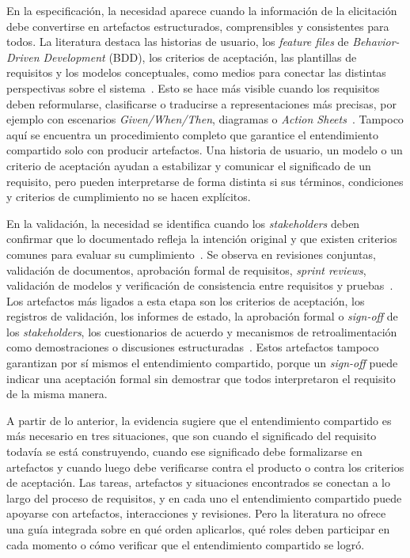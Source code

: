 \documentclass[12pt,letterpaper,oneside]{report}
\begin{document}
En la especificación, la necesidad aparece cuando la información de la
elicitación debe convertirse en artefactos estructurados, comprensibles y
consistentes para todos. La literatura destaca las historias de usuario, los
\textit{feature files} de \textit{Behavior-Driven Development} (BDD), los
criterios de aceptación, las plantillas de requisitos y los modelos
conceptuales, como medios para conectar las distintas perspectivas sobre el
sistema~\cite{irshad2021bdd}. Esto se hace más visible cuando los requisitos
deben reformularse, clasificarse o traducirse a representaciones más precisas,
por ejemplo con escenarios \textit{Given/When/Then}, diagramas o \textit{Action
Sheets}~\cite{gupta2022}. Tampoco aquí se encuentra un procedimiento completo
que garantice el entendimiento compartido solo con producir artefactos. Una
historia de usuario, un modelo o un criterio de aceptación ayudan a estabilizar
y comunicar el significado de un requisito, pero pueden interpretarse de forma
distinta si sus términos, condiciones y criterios de cumplimiento no se hacen
explícitos.

En la validación, la necesidad se identifica cuando los \textit{stakeholders}
deben confirmar que lo documentado refleja la intención original y que existen
criterios comunes para evaluar su cumplimiento~\cite{kunz2016}. Se observa en
revisiones conjuntas, validación de documentos, aprobación formal de
requisitos, \textit{sprint reviews}, validación de modelos y verificación de
consistencia entre requisitos y pruebas~\cite{pacheco2022}. Los artefactos más
ligados a esta etapa son los criterios de aceptación, los registros de
validación, los informes de estado, la aprobación formal o \textit{sign-off} de
los \textit{stakeholders}, los cuestionarios de acuerdo y mecanismos de
retroalimentación como demostraciones o discusiones
estructuradas~\cite{laporte2023}. Estos artefactos tampoco garantizan por sí
mismos el entendimiento compartido, porque un \textit{sign-off} puede indicar
una aceptación formal sin demostrar que todos interpretaron el requisito de la
misma manera.

A partir de lo anterior, la evidencia sugiere que el entendimiento compartido es
más necesario en tres situaciones, que son cuando el significado del requisito
todavía se está construyendo, cuando ese significado debe formalizarse en
artefactos y cuando luego debe verificarse contra el producto o contra los
criterios de aceptación. Las tareas, artefactos y situaciones encontrados se
conectan a lo largo del proceso de requisitos, y en cada uno el entendimiento
compartido puede apoyarse con artefactos, interacciones y revisiones. Pero la
literatura no ofrece una guía integrada sobre en qué orden aplicarlos, qué roles
deben participar en cada momento o cómo verificar que el entendimiento compartido se logró.
\end{document}
